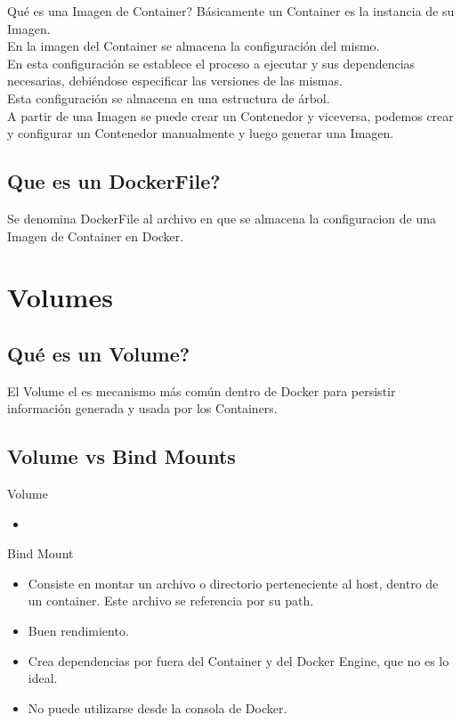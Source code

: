 \documentclass{beamer}
\begin{document}
\begin{frame}{Qué es una Imagen de Container?}
 	Básicamente un Container es la instancia de su Imagen.\\
	En la imagen del Container se almacena la configuración del mismo.\\
	En esta configuración se establece el proceso a ejecutar y sus dependencias necesarias, debiéndose especificar las versiones de las mismas. \\
	Esta configuración se almacena en una estructura de árbol.\\
	A partir de una Imagen se puede crear un Contenedor y viceversa, podemos crear y configurar un Contenedor manualmente y luego generar una Imagen.
	
\end{frame}

\subsection{Que es un DockerFile?}
\begin{frame}
	Se denomina DockerFile al archivo en que se almacena la configuracion de una Imagen de Container en Docker.
\end{frame}

\section{Volumes}

\subsection{Qué es un Volume?}

\begin{frame}
	El Volume el es mecanismo más común dentro de Docker para persistir información generada y usada por los Containers.
\end{frame}

\subsection{Volume vs Bind Mounts}

\begin{frame}
	Volume
	\begin{itemize}
		\item
	\end{itemize}
	Bind Mount
	\begin{itemize}
		\item
		Consiste en montar un archivo o directorio perteneciente al host, dentro de un container. Este archivo se referencia por su path.
		\item
		Buen rendimiento.
		\item
		Crea dependencias por fuera del Container y del Docker Engine, que no es lo ideal.
		\item
		No puede utilizarse desde la consola de Docker.
	\end{itemize}
\end{frame}
\end{document}
